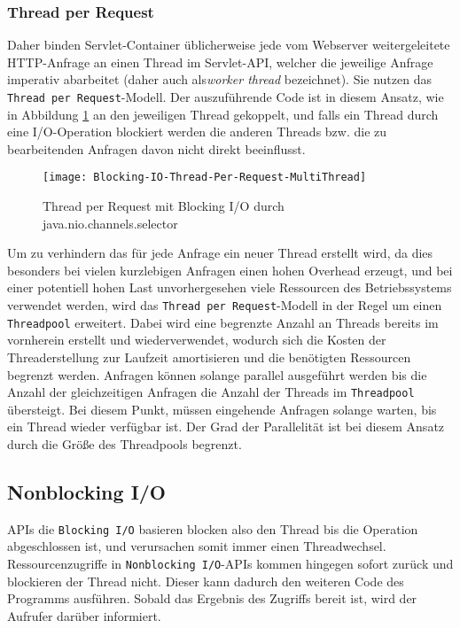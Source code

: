 \subsubsection{Thread per Request}
\label{subsubsec:thread per request}
Daher binden Servlet-Container üblicherweise jede vom Webserver weitergeleitete HTTP-Anfrage an einen
Thread im Servlet-API, welcher die jeweilige Anfrage imperativ abarbeitet
(daher auch als\textit{worker thread} bezeichnet). Sie nutzen das \verb|Thread per Request|-Modell.
Der auszuführende Code ist in diesem Ansatz, wie in Abbildung \ref{fig:blocking_thread_per_request}
an den jeweiligen Thread gekoppelt, und falls ein Thread durch eine I/O-Operation blockiert werden
die anderen Threads bzw. die zu bearbeitenden Anfragen davon nicht direkt beeinflusst.
\begin{figure}[ht!]
	\centering
	\texttt{[image: Blocking-IO-Thread-Per-Request-MultiThread]}
	\caption{Thread per Request mit Blocking I/O durch java.nio.channels.selector \parencite{NettyInAction}}
	\label{fig:blocking_thread_per_request}
\end{figure}

Um zu verhindern das für jede Anfrage ein neuer Thread erstellt wird, da dies besonders bei vielen kurzlebigen
Anfragen einen hohen Overhead erzeugt, und bei einer potentiell hohen Last
unvorhergesehen viele Ressourcen des Betriebssystems verwendet werden, wird das \verb|Thread per Request|-Modell
in der Regel um einen \verb|Threadpool| erweitert.
Dabei wird eine begrenzte Anzahl an Threads bereits im vornherein erstellt und wiederverwendet, wodurch sich die Kosten der Threaderstellung
zur Laufzeit amortisieren und die benötigten Ressourcen begrenzt werden.
Anfragen können solange parallel ausgeführt werden bis die Anzahl der gleichzeitigen Anfragen die
Anzahl der Threads im \verb|Threadpool| übersteigt.
Bei diesem Punkt, müssen eingehende Anfragen solange warten, bis ein Thread wieder verfügbar ist.
Der Grad der Parallelität ist bei diesem Ansatz durch die Größe des Threadpools begrenzt.
\newpage
\subsection{Nonblocking I/O}
\label{subsec:nonblocking-i/o}
APIs die \verb|Blocking I/O| basieren blocken also den Thread bis die Operation abgeschlossen ist, und verursachen somit
immer einen Threadwechsel.
Ressourcenzugriffe in \verb|Nonblocking I/O|-APIs kommen hingegen sofort zurück und blockieren der Thread nicht.
Dieser kann dadurch den weiteren Code des Programms ausführen.
Sobald das Ergebnis des Zugriffs bereit ist, wird der Aufrufer darüber informiert.


